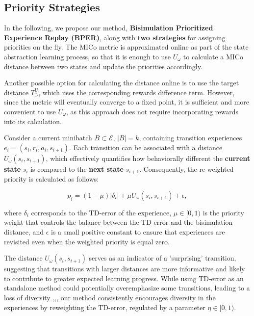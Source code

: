 \subsection{Priority Strategies}


In the following, we propose our method, \textbf{Bisimulation Prioritized Experience Replay (BPER)}, along with \textbf{two strategies} for assigning priorities on the fly. The MICo metric is approximated online as part of the state abstraction learning process, so that it is enough to use $U_\omega$ to calculate a MICo distance between two states and update the priorities accordingly.

Another possible option for calculating the distance online is to use the target distance \(T^U_{\bar{\omega}}\), which uses the corresponding rewards difference term. However, since the metric will eventually converge to a fixed point, it is sufficient and more convenient to use \(U_\omega\), as this approach does not require incorporating rewards into its calculation.


\begin{strategy}
Consider a current minibatch \(B \subset \mathcal{E}\), $|B| = k$, containing transition experiences \(e_i = (s_i, r_i, a_i, s_{i+1})\). Each transition can be associated with a distance \(U_\omega(s_i, s_{i+1})\), which effectively quantifies how behaviorally different the \textbf{current state} \(s_i\) is compared to the \textbf{next state} \(s_{i+1}\). Consequently, the re-weighted priority is calculated as follows:

\begin{equation}
    p_i = (1 - \mu) |\delta_i| + \mu U_\omega(s_i, s_{i+1}) + \epsilon,
\end{equation}

where \(\delta_i\) corresponds to the TD-error of the experience, \(\mu \in [0,1)\) is the priority weight that controls the balance between the TD-error and the bisimulation distance, and \(\epsilon\) is a small positive constant to ensure that experiences are revisited even when the weighted priority is equal zero.
\end{strategy}

The distance \(U_\omega(s_i, s_{i+1})\) serves as an indicator of a 'surprising' transition, suggesting that transitions with larger distances are more informative and likely to contribute to greater expected learning progress. While using TD-error as an standalone method could potentially overemphasize some transitions, leading to a loss of diversity \cite{schaul2015prioritized},\cite{pan2022understanding},\cite{fedus2020revisiting}, our method consistently encourages diversity in the experiences by reweighting the TD-error, regulated by a parameter $\eta \in [0,1)$.

